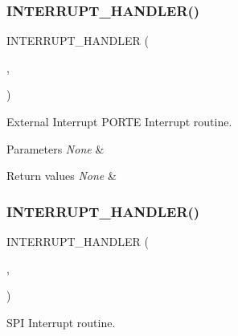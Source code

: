 \subsubsection{\texorpdfstring{I\+N\+T\+E\+R\+R\+U\+P\+T\+\_\+\+H\+A\+N\+D\+L\+E\+R()}{INTERRUPT\_HANDLER()}\hspace{0.1cm}{\footnotesize\ttfamily [8/16]}}
{\footnotesize\ttfamily I\+N\+T\+E\+R\+R\+U\+P\+T\+\_\+\+H\+A\+N\+D\+L\+ER (\begin{DoxyParamCaption}\item[{E\+X\+T\+I\+\_\+\+P\+O\+R\+T\+E\+\_\+\+I\+R\+Q\+Handler}]{,  }\item[{7}]{ }\end{DoxyParamCaption})}



External Interrupt P\+O\+R\+TE Interrupt routine. 


\begin{DoxyParams}{Parameters}
{\em None} & \\
\hline
\end{DoxyParams}

\begin{DoxyRetVals}{Return values}
{\em None} & \\
\hline
\end{DoxyRetVals}
\mbox{\label{group___u_a_r_t1___printf_ga43f22297150084bb297aba9f0176aeac}} 
\subsubsection{\texorpdfstring{I\+N\+T\+E\+R\+R\+U\+P\+T\+\_\+\+H\+A\+N\+D\+L\+E\+R()}{INTERRUPT\_HANDLER()}\hspace{0.1cm}{\footnotesize\ttfamily [9/16]}}
{\footnotesize\ttfamily I\+N\+T\+E\+R\+R\+U\+P\+T\+\_\+\+H\+A\+N\+D\+L\+ER (\begin{DoxyParamCaption}\item[{S\+P\+I\+\_\+\+I\+R\+Q\+Handler}]{,  }\item[{10}]{ }\end{DoxyParamCaption})}



S\+PI Interrupt routine. 


